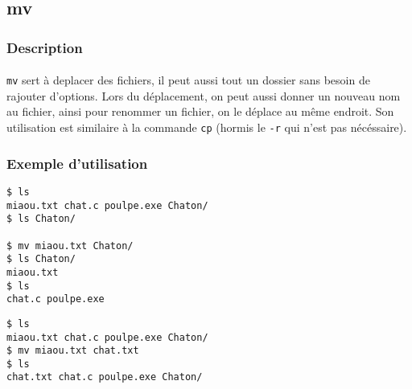 \subsection{mv}

\subsubsection*{Description}

\paragraph{}
\texttt{mv} sert à deplacer des fichiers, il peut aussi tout un dossier sans
besoin de rajouter d'options. Lors du déplacement, on peut aussi donner un
nouveau nom au fichier, ainsi pour renommer un fichier, on le déplace au même
endroit. Son utilisation est similaire à la commande \texttt{cp} (hormis le
\texttt{-r} qui n'est pas nécéssaire).

\subsubsection*{Exemple d'utilisation}

\begin{lstlisting}[caption=déplacement d'un fichier]
$ ls
miaou.txt chat.c poulpe.exe Chaton/
$ ls Chaton/

$ mv miaou.txt Chaton/
$ ls Chaton/
miaou.txt
$ ls
chat.c poulpe.exe
\end{lstlisting}

\begin{lstlisting}[caption=renommer un fichier]
$ ls
miaou.txt chat.c poulpe.exe Chaton/
$ mv miaou.txt chat.txt
$ ls
chat.txt chat.c poulpe.exe Chaton/
\end{lstlisting}
